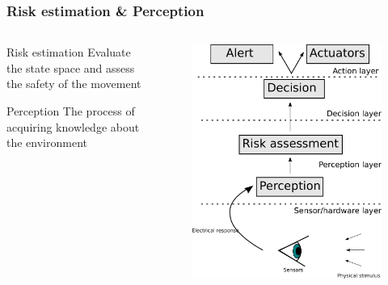 \documentclass{beamer}
\begin{document}
	\begin{frame}
		\frametitle{Risk estimation \& Perception}	
		
		\begin{columns}[t]
		  \begin{column}{6cm}

			\begin{block}{Risk estimation}
					Evaluate the state space and assess the safety of the movement
			\end{block}				  

			\begin{block}{Perception}
					The process of acquiring knowledge about the environment \cite{iyengar1991autonomous}
			\end{block}		
		  
		  \end{column}
		  
		  \begin{column}{6cm}
			\begin{figure}[h]
				\center
				\includegraphics[scale=0.23]{../img/fig:sensors:roles}
			\end{figure}
		  \end{column}
		 \end{columns}		
		


\end{frame}
\end{document}
